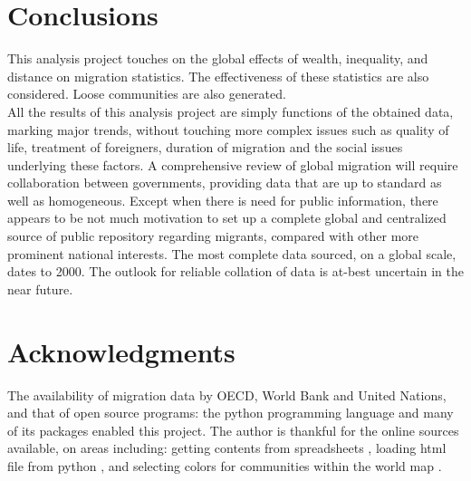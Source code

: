 \documentclass{acm_proc_article-sp}
\begin{document}
\section{Conclusions}
This analysis project touches on the global effects of wealth, inequality, and distance on migration statistics. The effectiveness of these statistics are also considered. Loose communities are also generated.
\\
All the results of this analysis project are simply functions of the obtained data, marking major trends, without touching more complex issues such as quality of life, treatment of foreigners, duration of migration and the social issues underlying these factors. A comprehensive review of global migration will require collaboration between governments, providing data that are up to standard as well as homogeneous. Except when there is need for public information, there appears to be not much motivation to set up a complete global and centralized source of public repository regarding migrants, compared with other more prominent national interests. The most complete data sourced, on a global scale, dates to 2000. The outlook for reliable collation of data is at-best uncertain in the near future.

\section{Acknowledgments}
The availability of migration data by OECD, World Bank and United Nations, and that of open source programs: the python programming language and many of its packages enabled this project. The author is thankful for the online sources available, on areas including: getting contents from spreadsheets \cite{xlrd}, loading html file from python \cite{html}, and selecting colors for communities within the world map \cite{color}.




\balancecolumns 
\end{document}
